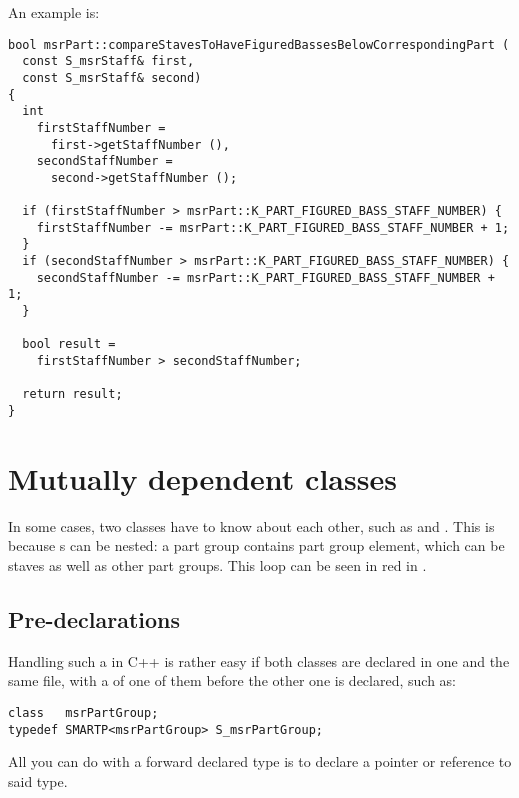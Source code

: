 An example is:
\begin{lstlisting}[language=Terminal]
bool msrPart::compareStavesToHaveFiguredBassesBelowCorrespondingPart (
  const S_msrStaff& first,
  const S_msrStaff& second)
{
  int
    firstStaffNumber =
      first->getStaffNumber (),
    secondStaffNumber =
      second->getStaffNumber ();

  if (firstStaffNumber > msrPart::K_PART_FIGURED_BASS_STAFF_NUMBER) {
    firstStaffNumber -= msrPart::K_PART_FIGURED_BASS_STAFF_NUMBER + 1;
  }
  if (secondStaffNumber > msrPart::K_PART_FIGURED_BASS_STAFF_NUMBER) {
    secondStaffNumber -= msrPart::K_PART_FIGURED_BASS_STAFF_NUMBER + 1;
  }

  bool result =
    firstStaffNumber > secondStaffNumber;

  return result;
}
\end{lstlisting}


\section{Mutually dependent classes}

In some cases, two classes have to know about each other, such as  and . This is because s can be nested: a part group contains part group element, which can be staves as well as other part groups. This loop can be seen in red in .


\subsection{Pre-declarations}

Handling such a  in C++ is rather easy if both classes are declared in one and the same  file, with a  of one of them before the other one is declared, such as:
\begin{lstlisting}[language=CPlusPlus]
class   msrPartGroup;
typedef SMARTP<msrPartGroup> S_msrPartGroup;
\end{lstlisting}

All you can do with a forward declared type is to declare a pointer or reference to said type.


